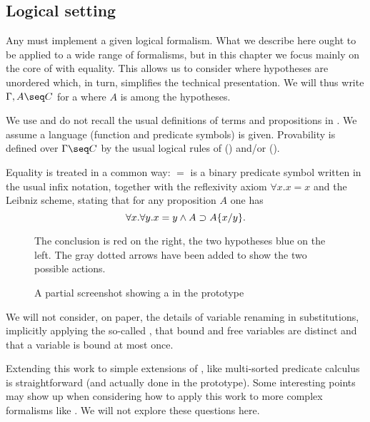 \begin{scope}

\section{Logical setting}

Any  must implement a given logical formalism. What we describe
here ought to be applied to a wide range of formalisms, but in this chapter we
focus mainly on the core of   with equality. This
allows us to consider  where hypotheses are unordered which, in
turn, simplifies the technical presentation. We will thus write $\Gamma,A \seq
C$ for a  where $A$ is among the hypotheses.

We use and do not recall the usual definitions of terms and propositions in
. We assume a  language (function and predicate symbols)
is given. Provability is defined over  $\Gamma\seq C$ by the usual
logical rules of  () and/or  ().

Equality is treated in a common way: $=$ is a binary
predicate symbol written in the usual infix notation, together with the
reflexivity axiom $\forall x.x=x$ and the Leibniz scheme, stating that for any
proposition $A$ one has
$$\forall x.\forall y. x=y\land A \supset A \{ x / y \}.$$

\begin{figure*}
 \begin{center}
 \end{center}
 The conclusion is red on the right, the two hypotheses blue on the left. The
 gray dotted arrows have been added to show the two possible actions.
 \caption{A partial screenshot showing a  in the  prototype}
\end{figure*}

\AP
We will not consider, on paper, the details of variable renaming in
substitutions, implicitly applying the so-called ,
that bound and free variables are distinct and that a variable is bound at most
once.

Extending this work to simple extensions of , like multi-sorted predicate
calculus is straightforward (and actually done in the  prototype). Some
interesting points may show up when considering how to apply this work to more
complex formalisms like . We will not explore these questions here.


\end{scope}

